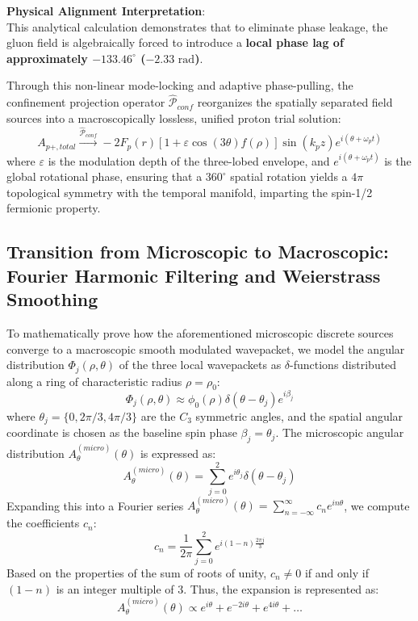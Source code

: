 \documentclass[12pt, a4paper]{article}
\begin{document}
\textbf{Physical Alignment Interpretation}: \\
This analytical calculation demonstrates that to eliminate phase leakage, the gluon field is algebraically forced to introduce a \textbf{local phase lag of approximately $-133.46^\circ$ ($-2.33\text{ rad}$)}.

Through this non-linear mode-locking and adaptive phase-pulling, the confinement projection operator $\hat{\mathcal{P}}_{conf}$ reorganizes the spatially separated field sources into a macroscopically lossless, unified proton trial solution:
\begin{equation}
A_{p+, total} \xrightarrow{\hat{\mathcal{P}}_{conf}} -2 F_p(r) \left[ 1 + \varepsilon \cos(3\theta) f(\rho) \right] \sin(k_p z) e^{i(\theta + \omega_p t)} \label{eq:proton_final}
\end{equation}
where $\varepsilon$ is the modulation depth of the three-lobed envelope, and $e^{i(\theta + \omega_p t)}$ is the global rotational phase, ensuring that a $360^\circ$ spatial rotation yields a $4\pi$ topological symmetry with the temporal manifold, imparting the spin-1/2 fermionic property.

\subsection{Transition from Microscopic to Macroscopic: Fourier Harmonic Filtering and Weierstrass Smoothing}

To mathematically prove how the aforementioned microscopic discrete sources converge to a macroscopic smooth modulated wavepacket, we model the angular distribution $\Phi_j(\rho, \theta)$ of the three local wavepackets as $\delta$-functions distributed along a ring of characteristic radius $\rho = \rho_0$:
\begin{equation}
\Phi_j(\rho, \theta) \approx \phi_0(\rho) \delta(\theta - \theta_j) e^{i\beta_j} \label{eq:delta_distribution}
\end{equation}
where $\theta_j = \{0, 2\pi/3, 4\pi/3\}$ are the $C_3$ symmetric angles, and the spatial angular coordinate is chosen as the baseline spin phase $\beta_j = \theta_j$. The microscopic angular distribution $A_\theta^{(micro)}(\theta)$ is expressed as:
\begin{equation}
A_\theta^{(micro)}(\theta) = \sum_{j=0}^2 e^{i\theta_j} \delta(\theta - \theta_j) \label{eq:micro_angular}
\end{equation}
Expanding this into a Fourier series $A_\theta^{(micro)}(\theta) = \sum_{n=-\infty}^\infty c_n e^{in\theta}$, we compute the coefficients $c_n$:
\begin{equation}
c_n = \frac{1}{2\pi} \sum_{j=0}^2 e^{i(1-n)\frac{2\pi j}{3}} \label{eq:fourier_coeff}
\end{equation}
Based on the properties of the sum of roots of unity, $c_n \neq 0$ if and only if $(1-n)$ is an integer multiple of $3$. Thus, the expansion is represented as:
\begin{equation}
A_\theta^{(micro)}(\theta) \propto e^{i\theta} + e^{-2i\theta} + e^{4i\theta} + \dots \label{eq:fourier_series}
\end{equation}
\end{document}
